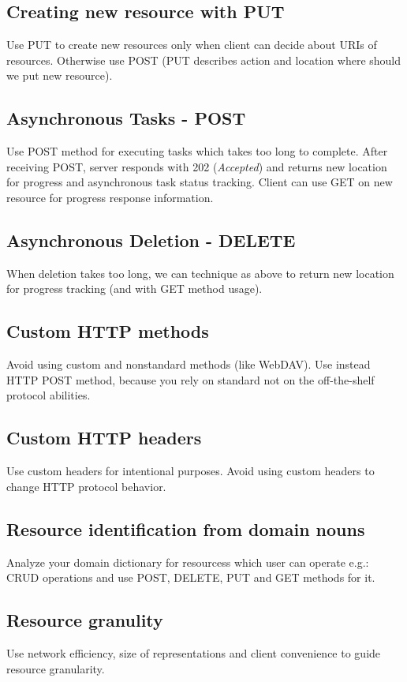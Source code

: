 \documentclass[11pt,a4paper]{article}
\begin{document}
\subsection{Creating new resource with PUT}
Use PUT to create new resources only when client can decide about URIs of resources. Otherwise use POST (PUT describes action and location where should we put new resource).

\subsection{Asynchronous Tasks - POST}
Use POST method for executing tasks which takes too long to complete. After receiving POST, server responds with 202 (\textit{Accepted}) and returns new location for progress and asynchronous task status tracking. Client can use GET on new resource for progress response information.

\subsection{Asynchronous Deletion - DELETE}
When deletion takes too long, we can technique as above to return new location for progress tracking (and with GET method usage).

\subsection{Custom HTTP methods}
Avoid using custom and nonstandard methods (like WebDAV). Use instead HTTP POST method, because you rely on standard not on the off-the-shelf protocol abilities.

\subsection{Custom HTTP headers}
Use custom headers for intentional purposes. Avoid using custom headers to change HTTP protocol behavior.

\subsection{Resource identification from domain nouns}
Analyze your domain dictionary for resourcess which user can operate e.g.: CRUD operations and use POST, DELETE, PUT and GET methods for it.

\subsection{Resource granulity}
Use network efficiency, size of representations and client convenience to guide resource granularity.
\end{document}
